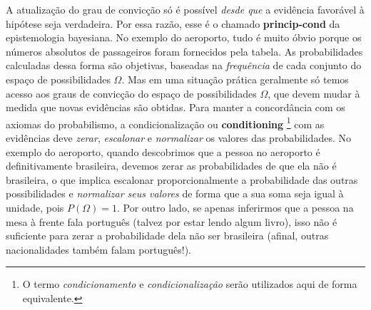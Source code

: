 \documentclass[./main.tex]{subfiles}
\begin{document}
\par A atualização do grau de convicção só é possível \textit{desde que} a evidência favorável à hipótese seja verdadeira. Por essa razão, esse é o chamado \textbf{\gls{princip-cond}} da epistemologia bayesiana. No exemplo do aeroporto, tudo é muito óbvio porque os números absolutos de passageiros foram fornecidos pela tabela. As probabilidades calculadas dessa forma são objetivas, baseadas na \textit{frequência} de cada conjunto do espaço de possibilidades $\Omega$. Mas em uma situação prática geralmente só temos acesso aos graus de convicção do espaço de possibilidades $\Omega$, que devem mudar à medida que novas evidências são obtidas. Para manter a concordância com os axiomas do probabilismo, a condicionalização ou \textbf{\gls{conditioning}} \footnote{O termo \textit{condicionamento} e \textit{condicionalização} serão utilizados aqui de forma equivalente.} com as evidências deve \textit{zerar}, \textit{escalonar} e \textit{normalizar} os valores das probabilidades. No exemplo do aeroporto, quando descobrimos que a pessoa no aeroporto é definitivamente brasileira, devemos zerar as probabilidades de que ela não é brasileira, o que implica escalonar proporcionalmente a probabilidade das outras possibilidades e \textit{normalizar seus valores} de forma que a sua soma seja igual à unidade, pois $P(\Omega) = 1$. Por outro lado, se apenas inferirmos que a pessoa na mesa à frente fala português (talvez por estar lendo algum livro), isso não é suficiente para zerar a probabilidade dela não ser brasileira (afinal, outras nacionalidades também falam português!).
\end{document}
